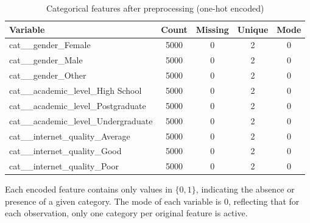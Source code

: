 \begin{table}[t]
\centering
\caption{Categorical features after preprocessing (one-hot encoded)}
\begin{tabular}{lcccc}
\toprule
\textbf{Variable} & \textbf{Count} & \textbf{Missing} & \textbf{Unique} & \textbf{Mode} \\
\midrule
cat\_\_gender\_Female & 5000 & 0 & 2 & 0 \\
cat\_\_gender\_Male & 5000 & 0 & 2 & 0 \\
cat\_\_gender\_Other & 5000 & 0 & 2 & 0 \\
cat\_\_academic\_level\_High School & 5000 & 0 & 2 & 0 \\
cat\_\_academic\_level\_Postgraduate & 5000 & 0 & 2 & 0 \\
cat\_\_academic\_level\_Undergraduate & 5000 & 0 & 2 & 0 \\
cat\_\_internet\_quality\_Average & 5000 & 0 & 2 & 0 \\
cat\_\_internet\_quality\_Good & 5000 & 0 & 2 & 0 \\
cat\_\_internet\_quality\_Poor & 5000 & 0 & 2 & 0 \\
\bottomrule
\end{tabular}
\end{table}

Each encoded feature contains only values in $\{0,1\}$, indicating the absence or presence of a given category. The mode of each variable is 0, reflecting that for each observation, only one category per original feature is active.

